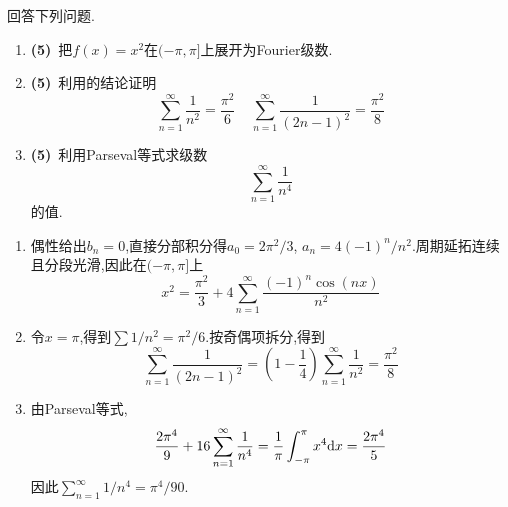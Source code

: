 \documentclass{ctexart}
\begin{document}
\begin{problem}[9.(15\songti{分})]
回答下列问题.
        \begin{enumerate}[label=\tbf{(\arabic*)},topsep=0pt,parsep=0pt,itemsep=0pt,partopsep=0pt]
            \item \textbf{(5)}\ 把$f(x)=x^2$在$(-\pi,\pi]$上展开为Fourier级数.
            \item \textbf{(5)}\ 利用的结论证明
                \[\sum_{n=1}^{\infty}\dfrac{1}{n^2}=\dfrac{\pi^2}{6}\ \ \ \ \ \sum_{n=1}^{\infty}\dfrac{1}{(2n-1)^2}=\dfrac{\pi^2}{8}\]
            \item \textbf{(5)}\ 利用Parseval等式求级数
                \[\sum_{n=1}^{\infty}\dfrac{1}{n^4}\]
                的值.
        \end{enumerate}
\end{problem}
\begin{solution}
\begin{enumerate}[label=\tbf{(\arabic*)},topsep=0pt,parsep=0pt,itemsep=0pt,partopsep=0pt]
\item 偶性给出$b_n=0$,直接分部积分得$a_0=2\pi^2/3$, $a_n=4(-1)^n/n^2$.周期延拓连续且分段光滑,因此在$(-\pi,\pi]$上
\[x^2=\frac{\pi^2}{3}+4\sum_{n=1}^{\infty}\frac{(-1)^n\cos(nx)}{n^2}\]
\item 令$x=\pi$,得到$\sum1/n^2=\pi^2/6$.按奇偶项拆分,得到
\[\sum_{n=1}^{\infty}\frac1{(2n-1)^2}
=\left(1-\frac14\right)\sum_{n=1}^{\infty}\frac1{n^2}=\frac{\pi^2}{8}\]
\item 由Parseval等式,
\[\frac{2\pi^4}{9}+16\sum_{n=1}^{\infty}\frac1{n^4}
=\frac1\pi\int_{-\pi}^\pi x^4\mathrm{d} x=\frac{2\pi^4}{5}\]
因此$\displaystyle\sum_{n=1}^{\infty}1/n^4=\pi^4/90$.
\end{enumerate}
\end{solution}
\end{document}
